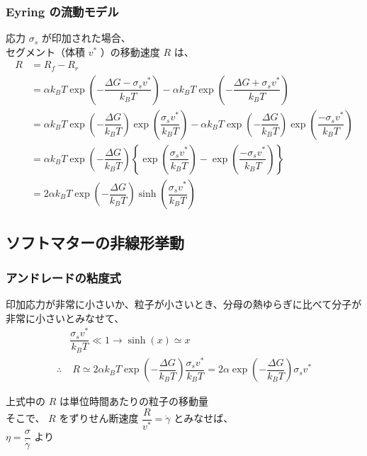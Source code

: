 \documentclass[1４pt, dvipdfmx]{beamer}
\begin{document}
\begin{frame}
\frametitle{Eyring の流動モデル}
\Large
応力 $\sigma_s$ が印加された場合、\\セグメント（体積 $v^*$ ）の移動速度 $R$ は、
\small
\begin{align*}
	R
	&= R_f -R_r \\
	&= \alpha k_B T \exp \left( - \dfrac{\Delta G - \sigma_s v^*}{k_BT} \right)
	-\alpha k_B T \exp \left( - \dfrac{\Delta G + \sigma_s v^*}{k_BT} \right) \\
	&= \alpha k_B T \exp \left( - \dfrac{\Delta G}{k_BT} \right) \exp \left(\dfrac{\sigma_s v^*}{k_BT} \right)
	- \alpha k_B T \exp \left( - \dfrac{\Delta G}{k_BT} \right) \exp \left(\dfrac{-\sigma_s v^*}{k_BT} \right)\\
	&= \alpha k_B T \exp \left( - \dfrac{\Delta G}{k_BT} \right) \left\{ \exp \left(\dfrac{\sigma_s v^*}{k_BT} \right)
	- \exp \left(\dfrac{-\sigma_s v^*}{k_BT} \right) \right\} \\
	&= 2 \alpha k_B T \exp \left( - \dfrac{\Delta G}{k_BT} \right) \sinh \left(\dfrac{\sigma_s v^*}{k_BT} \right)
\end{align*}

\end{frame}


\subsection{ソフトマターの非線形挙動}
\begin{frame}
\frametitle{アンドレードの粘度式}
\large
印加応力が非常に小さいか、粒子が小さいとき、分母の熱ゆらぎに比べて分子が非常に小さいとみなせて、
\begin{align*}
& \dfrac{\sigma_s v^*}{k_BT} \ll 1 \rightarrow \sinh(x) \simeq x \\
\therefore &\;  R \simeq 2 \alpha k_B T \exp \left( - \dfrac{\Delta G}{k_BT} \right) \dfrac{\sigma_s v^*}{k_BT}
	=2 \alpha \exp \left( - \dfrac{\Delta G}{k_BT} \right) \sigma_s v^*
\end{align*}

\large
上式中の $R$ は単位時間あたりの粒子の移動量\\
そこで、
$R$ をずりせん断速度 $\dfrac{R}{v^*} = \dot{\gamma}$ とみなせば、\\
$\eta = \dfrac{\sigma}{\dot{\gamma}}$ より
\end{frame}
\end{document}
